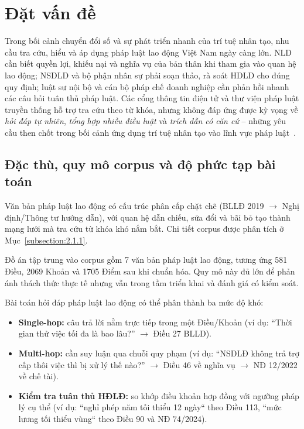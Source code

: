 \documentclass[../DoAn.tex]{subfiles}
\begin{document}
\section{Đặt vấn đề}
\label{section:1.1}

Trong bối cảnh chuyển đổi số và sự phát triển nhanh của trí tuệ nhân tạo, nhu cầu tra cứu, hiểu và áp dụng pháp luật lao động Việt Nam ngày càng lớn. \gls{NLD} cần biết quyền lợi, khiếu nại và nghĩa vụ của bản thân khi tham gia vào quan hệ lao động; \gls{NSDLD} và bộ phận nhân sự phải soạn thảo, rà soát \gls{HDLD} cho đúng quy định; luật sư nội bộ và cán bộ pháp chế doanh nghiệp cần phản hồi nhanh các câu hỏi tuân thủ pháp luật. Các cổng thông tin điện tử và thư viện pháp luật truyền thống hỗ trợ tra cứu theo từ khóa, nhưng không đáp ứng được kỳ vọng về \emph{hỏi đáp tự nhiên}, \emph{tổng hợp nhiều điều luật} và \emph{trích dẫn có căn cứ} -- những yêu cầu then chốt trong bối cảnh ứng dụng trí tuệ nhân tạo vào lĩnh vực pháp luật~\cite{ji2023hallucination}.

\subsection{Đặc thù, quy mô corpus và độ phức tạp bài toán}
\label{subsection:1.1.2}

Văn bản pháp luật lao động có cấu trúc phân cấp chặt chẽ (BLLĐ 2019 $\rightarrow$ Nghị định/Thông tư hướng dẫn), với quan hệ dẫn chiếu, sửa đổi và bãi bỏ tạo thành mạng lưới mà tra cứu từ khóa khó nắm bắt. Chi tiết corpus được phân tích ở Mục~\ref{subsection:2.1.1}.

Đồ án tập trung vào corpus gồm 7 văn bản pháp luật lao động, tương ứng 581 Điều, 2069 Khoản và 1705 Điểm sau khi chuẩn hóa. Quy mô này đủ lớn để phản ánh thách thức thực tế nhưng vẫn trong tầm triển khai và đánh giá có kiểm soát.

Bài toán hỏi đáp pháp luật lao động có thể phân thành ba mức độ khó:

\begin{itemize}[nosep, leftmargin=*]
    \item \textbf{Single-hop:} câu trả lời nằm trực tiếp trong một Điều/Khoản (ví dụ: ``Thời gian thử việc tối đa là bao lâu?'' $\rightarrow$ Điều 27 \gls{BLLD}).
    \item \textbf{Multi-hop:} cần suy luận qua chuỗi quy phạm (ví dụ: ``NSDLĐ không trả trợ cấp thôi việc thì bị xử lý thế nào?'' $\rightarrow$ Điều 46 về nghĩa vụ $\rightarrow$ NĐ 12/2022 về chế tài).
    \item \textbf{Kiểm tra tuân thủ HĐLĐ:} so khớp điều khoản hợp đồng với ngưỡng pháp lý cụ thể (ví dụ: ``nghỉ phép năm tối thiểu 12 ngày`` theo Điều 113, ``mức lương tối thiểu vùng`` theo Điều 90 và NĐ 74/2024).
\end{itemize}
\end{document}
